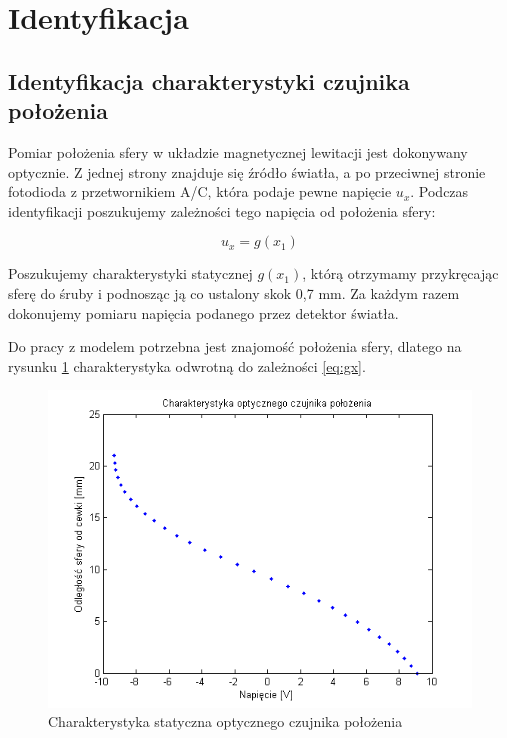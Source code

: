 \section{Identyfikacja}


\subsection{Identyfikacja charakterystyki czujnika położenia}

Pomiar położenia sfery w układzie magnetycznej lewitacji jest dokonywany optycznie. Z jednej strony znajduje się źródło światła, a po przeciwnej stronie fotodioda z przetwornikiem A/C, która podaje pewne napięcie $u_x$. Podczas identyfikacji poszukujemy zależności tego napięcia od położenia sfery:

\begin{equation} \label{eq:gx}
u_x = g(x_1)
\end{equation}

Poszukujemy charakterystyki statycznej $g(x_1)$, którą otrzymamy przykręcając sferę do śruby i podnosząc ją co ustalony skok 0,7 mm. Za każdym razem dokonujemy pomiaru napięcia podanego przez detektor światła.

Do pracy z modelem potrzebna jest znajomość położenia sfery, dlatego na rysunku \ref{img:gx} charakterystyka odwrotną do zależności \ref{eq:gx}.

\begin{figure}[!htb]
\centering
\includegraphics[scale=1]{img/czujnik_polozenia.png}
\caption{Charakterystyka statyczna optycznego czujnika położenia}
\label{img:gx}
\end{figure}


